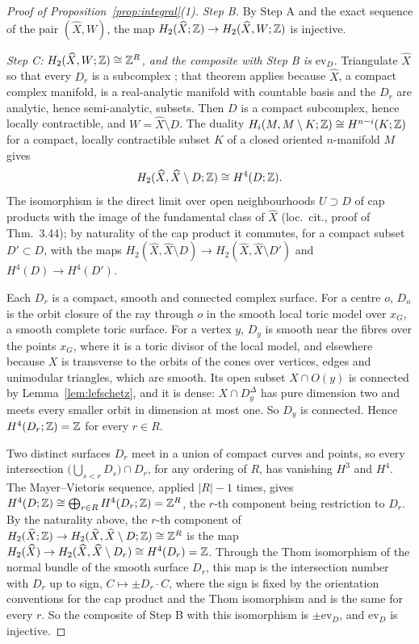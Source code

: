 \begin{proof}[Proof of Proposition~\ref{prop:integral}(1)]
\emph{Step B.} By Step A and the exact sequence of the pair $(\widehat X,W)$, the map
$H_2(\widehat X;\mathbb Z)\to H_2(\widehat X,W;\mathbb Z)$ is injective.

\emph{Step C: $H_2(\widehat X,W;\mathbb Z)\cong\mathbb Z^R$, and the composite with Step B is $\mathrm{ev}_D$.} Triangulate $\widehat X$ so
that every $D_r$ is a subcomplex \cite[Thm.~2]{Loj64}; that theorem applies because $\widehat X$, a compact complex
manifold, is a real-analytic manifold with countable basis and the $D_r$ are analytic, hence semi-analytic, subsets. Then $D$
is a compact subcomplex, hence locally contractible, and $W=\widehat X\setminus D$. The duality
$H_i(M,M\setminus K;\mathbb Z)\cong H^{n-i}(K;\mathbb Z)$ for a compact, locally contractible subset $K$ of a closed oriented
$n$-manifold $M$ \cite[Thm.~3.44]{Hat02} gives
\[
H_2(\widehat X,\widehat X\setminus D;\mathbb Z)\cong H^4(D;\mathbb Z).
\]
The isomorphism is the direct limit over open neighbourhoods $U\supset D$ of cap products with the image of the
fundamental class of $\widehat X$ (loc.\ cit., proof of Thm.~3.44); by naturality of the cap product it commutes, for a
compact subset $D'\subset D$, with the maps $H_2(\widehat X,\widehat X\setminus D)\to H_2(\widehat X,\widehat X\setminus D')$
and $H^4(D)\to H^4(D')$.

Each $D_r$ is a compact, smooth and connected complex surface. For a centre $o$, $D_o$ is the orbit closure of the ray
through $o$ in the smooth local toric model over $x_G$, a smooth complete toric surface. For a vertex $y$, $D_y$ is smooth
near the fibres over the points $x_G$, where it is a toric divisor of the local model, and elsewhere because $X$ is
transverse to the orbits of the cones over vertices, edges and unimodular triangles, which are smooth. Its open subset
$X\cap O(y)$ is connected by Lemma~\ref{lem:lefschetz}, and it is dense: $X\cap D^\Delta_y$ has pure dimension two and meets
every smaller orbit in dimension at most one. So $D_y$ is connected. Hence $H^4(D_r;\mathbb Z)=\mathbb Z$ for every $r\in R$.

Two distinct surfaces $D_r$ meet in a
union of compact curves and points, so every intersection $\bigl(\bigcup_{s<r}D_s\bigr)\cap D_r$, for any ordering of $R$,
has vanishing $H^3$ and $H^4$. The Mayer--Vietoris sequence, applied $|R|-1$ times, gives
$H^4(D;\mathbb Z)\cong\bigoplus_{r\in R}H^4(D_r;\mathbb Z)=\mathbb Z^R$, the $r$-th component being restriction to $D_r$. By the naturality
above, the $r$-th component of $H_2(\widehat X;\mathbb Z)\to H_2(\widehat X,\widehat X\setminus D;\mathbb Z)\cong\mathbb Z^R$ is the map
$H_2(\widehat X)\to H_2(\widehat X,\widehat X\setminus D_r)\cong H^4(D_r)=\mathbb Z$. Through the Thom isomorphism of the normal bundle
of the smooth surface $D_r$, this map is the intersection number with $D_r$ up to sign, $C\mapsto\pm D_r\cdot C$, where
the sign is fixed by the orientation conventions for the cap product and the Thom isomorphism and is the same for every
$r$. So the composite of Step B with this isomorphism is $\pm\mathrm{ev}_D$, and $\mathrm{ev}_D$ is injective.
\end{proof}

